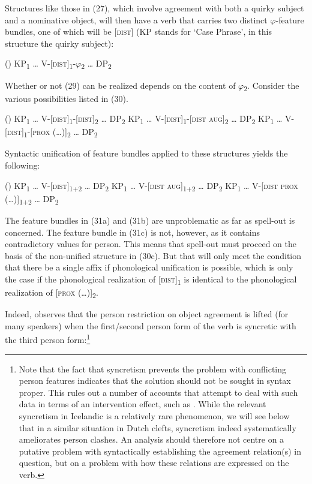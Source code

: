 \documentclass[output=paper]{langsci/langscibook}
\begin{document}
Structures like those in (27), which involve agreement with both a quirky subject and a nominative object, will then have a verb that carries two distinct $\varphi $-feature bundles, one of which will be [\textsc{dist}] (KP stands for ‘Case Phrase’, in this structure the quirky subject):

\ea (\label{bkm:Ref295466963})  KP\textsubscript{1} … V-[\textsc{dist}]\textsubscript{1}{}-$\varphi $\textsubscript{2} … DP\textsubscript{2} \z

Whether or not (29) can be realized depends on the content of $\varphi $\textsubscript{2}. Consider the various possibilities listed in (30).

\ea (\label{bkm:Ref295570245}\label{bkm:Ref295481259})  
\ea  KP\textsubscript{1} … V-[\textsc{dist}]\textsubscript{1}{}-[\textsc{dist}]\textsubscript{2} … DP\textsubscript{2}
\ex  KP\textsubscript{1} … V-[\textsc{dist}]\textsubscript{1}{}-[\textsc{dist} \textsc{aug}]\textsubscript{2} … DP\textsubscript{2}
\ex  KP\textsubscript{1} … V-[\textsc{dist}]\textsubscript{1}{}-[\textsc{prox} (…)]\textsubscript{2} … DP\textsubscript{2}
\z
\z

Syntactic unification of feature bundles applied to these structures yields the following:

\ea (\label{bkm:Ref295480997})  
\ea KP\textsubscript{1} … V-[\textsc{dist}]\textsubscript{1+2} … DP\textsubscript{2}
\ex KP\textsubscript{1} … V-[\textsc{dist} \textsc{aug}]\textsubscript{1+2} … DP\textsubscript{2}
\ex KP\textsubscript{1} … V-[\textsc{dist prox} (…)]\textsubscript{1+2} … DP\textsubscript{2}
\z
\z

The feature bundles in (31a) and (31b) are unproblematic as far as spell-out is concerned. The feature bundle in (31c) is not, however, as it contains contradictory values for person. This means that spell-out must proceed on the basis of the non-unified structure in (30c). But that will only meet the condition that there be a single affix if phonological unification is possible, which is only the case if the phonological realization of [\textsc{dist}]\textsubscript{1} is identical to the phonological realization of [\textsc{prox} (…)]\textsubscript{2}.

Indeed, \citet{Sigurðsson1996} observes that the person restriction on object agreement is lifted (for many speakers) when the first/second person form of the verb is syncretic with the third person form:\footnote{Note that the fact that syncretism prevents the problem with conflicting person features indicates that the solution should not be sought in syntax proper. This rules out a number of accounts that attempt to deal with such data in terms of an intervention effect, such as \citealt{Sigurðsson2008}. While the relevant syncretism in Icelandic is a relatively rare phenomenon, we will see below that in a similar situation in Dutch clefts, syncretism indeed systematically ameliorates person clashes. An analysis should therefore not centre on a putative problem with syntactically establishing the agreement relation(s) in question, but on a problem with how these relations are expressed on the verb.}
\end{document}
